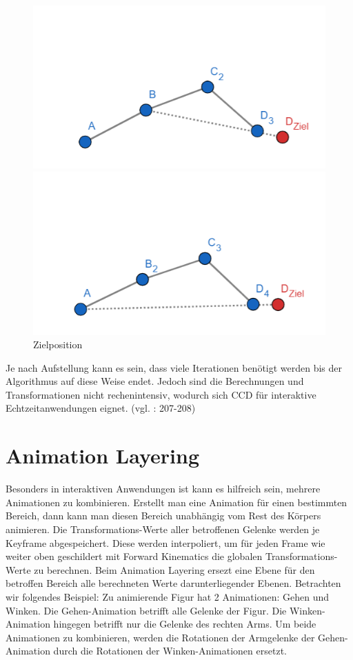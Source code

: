 \begin{figure}[!htb]
	\includegraphics[width=\linewidth]{geogebra/ccd_2.png}
	\caption{}\label{fig:ccd_2}
	\endminipage\hfill
	\includegraphics[width=\linewidth]{geogebra/ccd_3.png}
	\caption{Zielposition}\label{fig:ccd_3}
	\endminipage\hfill
\end{figure}
Je nach Aufstellung kann es sein, dass viele Iterationen benötigt werden bis der Algorithmus auf diese Weise endet. Jedoch sind die Berechnungen und Transformationen nicht rechenintensiv, wodurch sich CCD für interaktive Echtzeitanwendungen eignet. (vgl. \cite{Fedor2003}: 207-208)
%
\section{Animation Layering}
%
Besonders in interaktiven Anwendungen ist kann es hilfreich sein, mehrere Animationen zu kombinieren. Erstellt man eine Animation für einen bestimmten Bereich, dann kann man diesen Bereich unabhängig vom Rest des Körpers animieren. Die Transformations-Werte aller betroffenen Gelenke werden je Keyframe abgespeichert. Diese werden interpoliert, um für jeden Frame wie weiter oben geschildert mit Forward Kinematics die globalen Transformations-Werte zu berechnen. Beim Animation Layering ersezt eine Ebene für den betroffen Bereich alle berechneten Werte darunterliegender Ebenen.
\newline\newline
Betrachten wir folgendes Beispiel: \newline
Zu animierende Figur hat 2 Animationen: Gehen und Winken. Die Gehen-Animation betrifft alle Gelenke der Figur. Die Winken-Animation hingegen betrifft nur die Gelenke des rechten Arms. Um beide Animationen zu kombinieren, werden die Rotationen der Armgelenke der Gehen-Animation durch die Rotationen der Winken-Animationen ersetzt.
%
